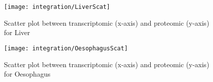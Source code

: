 \begin{figure}
    \texttt{[image: integration/LiverScat]}\centering
    \caption{Scatter plot between transcriptomic (x-axis) and  proteomic (y-axis)
    for Liver\label{fig:ScatterPlotLiver}}
\end{figure}



\begin{figure}
\texttt{[image: integration/OesophagusScat]}\centering
    \caption{Scatter plot between transcriptomic (x-axis) and  proteomic (y-axis)
    for Oesophagus\label{fig:ScatterPlotOesophagus}}
\end{figure}

